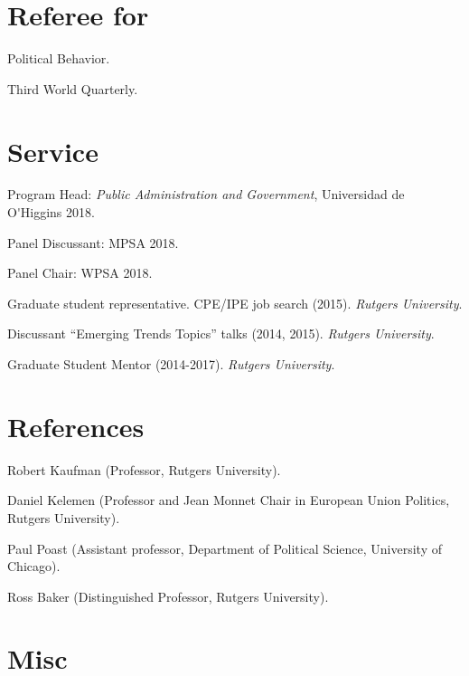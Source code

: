 \documentclass[letterpaper]{article}
\renewenvironment{itemize}{
  \begin{list}{}{
    \setlength{\leftmargin}{1.5em}
  }
}{
  \end{list}
}
\begin{document}

\section*{Referee for}
  \begin{itemize}
    \item[$\bullet$] Political Behavior.
    \item[$\bullet$] Third World Quarterly.
  \end{itemize}




\section*{Service}

\begin{itemize}
\item[$\bullet$] Program Head: \emph{Public Administration and Government}, Universidad de O\'\unskip Higgins 2018.
\item[$\bullet$] Panel Discussant: MPSA 2018.
\item[$\bullet$] Panel Chair: WPSA 2018.
\item[$\bullet$] Graduate student representative. CPE/IPE job search (2015). \emph{Rutgers University}.
\item[$\bullet$] Discussant ``Emerging Trends Topics'' talks (2014, 2015). \emph{Rutgers University}.
\item[$\bullet$] Graduate Student Mentor (2014-2017). \emph{Rutgers University}.
\end{itemize}




\section*{References}
\begin{itemize}
\item[$\bullet$] Robert Kaufman {\scriptsize(Professor, Rutgers University).}
\item[$\bullet$] Daniel Kelemen {\scriptsize(Professor and Jean Monnet Chair in
European Union Politics, Rutgers University).}
\item[$\bullet$] Paul Poast {\scriptsize(Assistant professor, Department of Political Science, University of Chicago).}
\item[$\bullet$] Ross Baker {\scriptsize(Distinguished Professor, Rutgers University).}
\end{itemize}




\section*{Misc}
{\unskip}




\bigskip
\end{document}
